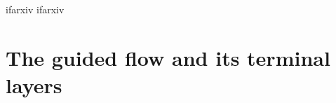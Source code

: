 \documentclass{article} %
\def\Eqref#1{Equation~\ref{#1}}
\newcommand{\E}{\mathbb{E}}
\newcommand{\R}{\mathbb{R}}
\theoremstyle{plain}
\theoremstyle{definition}
\theoremstyle{remark}
\providecommand{\dd}{\mathrm{d}}
\providecommand{\eexp}{\mathrm{e}}
\providecommand{\smin}{\sigma_{\min}}
\providecommand{\smax}{\sigma_{\max}}
\providecommand{\Dc}{D_{\mathrm{c}}}
\providecommand{\Du}{D_{\mathrm{u}}}
\providecommand{\Dw}{D_{w}}
\providecommand{\etac}{\eta_{\mathrm{c}}}
\providecommand{\etau}{\eta_{\mathrm{u}}}
\providecommand{\etaw}{\eta_{w}}
\def\Eqref#1{Equation~(\ref{#1})}
\newif\ifarxiv
\begin{document}
%
%
%

\providecommand{\E}{\mathbb{E}}
\providecommand{\R}{\mathbb{R}}
\providecommand{\eexp}{\mathrm{e}}
\providecommand{\dd}{\mathrm{d}}
\providecommand{\smin}{\sigma_{\min}}
\providecommand{\smax}{\sigma_{\max}}
\providecommand{\Dc}{D_{\mathrm{c}}}
\providecommand{\Du}{D_{\mathrm{u}}}
\providecommand{\Dw}{D_{w}}
\providecommand{\etac}{\eta_{\mathrm{c}}}
\providecommand{\etau}{\eta_{\mathrm{u}}}
\providecommand{\etaw}{\eta_{w}}
\providecommand{\Eqref}[1]{Equation~(\ref{#1})}

\ifcsname ifarxiv\endcsname\else
  \expandafter\newif\csname ifarxiv\endcsname
  \csname arxivtrue\endcsname
\fi

\section{The guided flow and its terminal layers}\label{sec:guided-flow}
\end{document}
